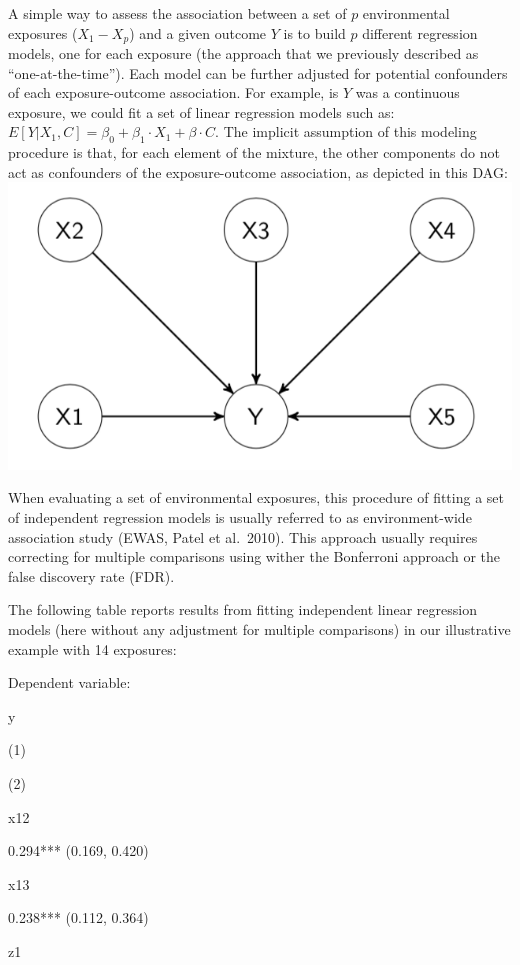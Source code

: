 \documentclass[
]{book}
\begin{document}
A simple way to assess the association between a set of \(p\) environmental exposures (\(X_1 - X_p\)) and a given outcome \(Y\) is to build \(p\) different regression models, one for each exposure (the approach that we previously described as ``one-at-the-time''). Each model can be further adjusted for potential confounders of each exposure-outcome association. For example, is \(Y\) was a continuous exposure, we could fit a set of linear regression models such as: \(E[Y|X_1,C]=\beta_0+\beta_1 \cdot X_1 + \beta\cdot C\). The implicit assumption of this modeling procedure is that, for each element of the mixture, the other components do not act as confounders of the exposure-outcome association, as depicted in this DAG:
\includegraphics{images/dag1.png}

When evaluating a set of environmental exposures, this procedure of fitting a set of independent regression models is usually referred to as environment-wide association study (EWAS, Patel et al.~2010). This approach usually requires correcting for multiple comparisons using wither the Bonferroni approach or the false discovery rate (FDR).

The following table reports results from fitting independent linear regression models (here without any adjustment for multiple comparisons) in our illustrative example with 14 exposures:

Dependent variable:

y

(1)

(2)

x12

0.294*** (0.169, 0.420)

x13

0.238*** (0.112, 0.364)

z1
\end{document}
